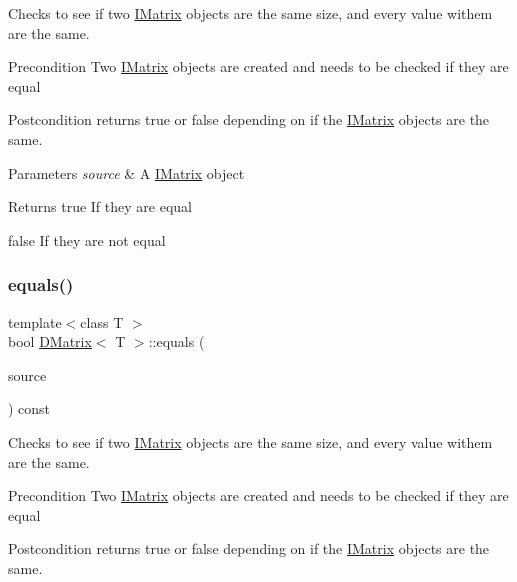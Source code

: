 Checks to see if two \mbox{\hyperlink{class_i_matrix}{I\+Matrix}} objects are the same size, and every value withem are the same. 

\begin{DoxyPrecond}{Precondition}
Two \mbox{\hyperlink{class_i_matrix}{I\+Matrix}} objects are created and needs to be checked if they are equal 
\end{DoxyPrecond}
\begin{DoxyPostcond}{Postcondition}
returns true or false depending on if the \mbox{\hyperlink{class_i_matrix}{I\+Matrix}} objects are the same.
\end{DoxyPostcond}

\begin{DoxyParams}{Parameters}
{\em source} & A \mbox{\hyperlink{class_i_matrix}{I\+Matrix}} object \\
\hline
\end{DoxyParams}
\begin{DoxyReturn}{Returns}
true If they are equal 

false If they are not equal 
\end{DoxyReturn}
\mbox{\label{class_d_matrix_a51e08cb9c9b3529b0575ea9668d70af1}} 
\subsubsection{\texorpdfstring{equals()}{equals()}\hspace{0.1cm}{\footnotesize\ttfamily [2/6]}}
{\footnotesize\ttfamily template$<$class T $>$ \\
bool \mbox{\hyperlink{class_d_matrix}{D\+Matrix}}$<$ T $>$\+::equals (\begin{DoxyParamCaption}\item[{const \mbox{\hyperlink{class_i_matrix}{I\+Matrix}}$<$ \mbox{\hyperlink{class_t_matrix}{T\+Matrix}}$<$ T $>$, T $>$ \&}]{source }\end{DoxyParamCaption}) const}



Checks to see if two \mbox{\hyperlink{class_i_matrix}{I\+Matrix}} objects are the same size, and every value withem are the same. 

\begin{DoxyPrecond}{Precondition}
Two \mbox{\hyperlink{class_i_matrix}{I\+Matrix}} objects are created and needs to be checked if they are equal 
\end{DoxyPrecond}
\begin{DoxyPostcond}{Postcondition}
returns true or false depending on if the \mbox{\hyperlink{class_i_matrix}{I\+Matrix}} objects are the same.
\end{DoxyPostcond}

